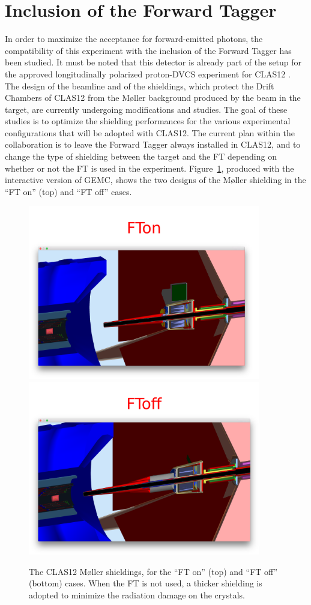 \section{Inclusion of the Forward Tagger}\label{ft_section}
In order to maximize the acceptance for forward-emitted photons, the compatibility of this experiment with the inclusion of the Forward Tagger has been studied. It must be noted that this detector is already part of the setup for the approved longitudinally polarized proton-DVCS experiment for CLAS12 \cite{E1206119}. 
The design of the beamline and of the shieldings, which protect the Drift Chambers of CLAS12 from the M\o ller background produced by the beam in the target, are currently undergoing modifications and studies. The goal of these studies is to optimize the shielding performances for the various experimental configurations that will be adopted with CLAS12. The current plan within the collaboration is to leave the Forward Tagger always installed in CLAS12, and to change the type of shielding between the target and the FT depending on whether or not the FT is used in the experiment. Figure~\ref{ft_shieldings}, produced with the interactive version of GEMC, shows the two designs of the M\o ller shielding in the ``FT on'' (top) and ``FT off'' cases. 
\begin{figure}[htbp] 
   \centering
   \includegraphics[width=4in]{FTon.pdf} 
   \includegraphics[width=4in]{FToff.pdf} 
   \caption{The CLAS12 M\o ller shieldings, for the ``FT on'' (top) and ``FT off'' (bottom) cases. When the FT is not used, a thicker shielding is adopted to minimize the radiation damage on the crystals.}
   \label{ft_shieldings}
\end{figure}
